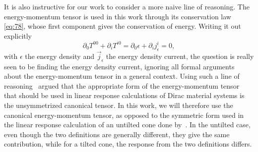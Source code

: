 It is also instructive for our work to consider a more naive line of reasoning.
The energy-momentum tensor is used in this work through its conservation law \cref{eq:78}, whose first component gives the conservation of energy.
Writing it out explicitly
\begin{equation}
  \label{eq:84}
  \partial_0T^{00} + \partial_i T^{i0} = \partial_0 \epsilon + \partial_i j^i_{\epsilon} = 0,
\end{equation}
with \( \epsilon \) the energy density and \( \vec{j}_{\epsilon} \) the energy density current, the question is really seen to be finding the energy density current, ignoring all formal arguments about the energy-momentum tensor in a general context.
Using such a line of reasoning~\textcite{vanderwurffMagnetovorticalThermoelectricTransport2019} argued that the appropriate form of the energy-momentum tensor that should be used in linear response calculations of Dirac material systems is the unsymmetrized canonical tensor.
In this work, we will therefore use the canonical energy-momentum tensor, as opposed to the symmetric form used in the linear response calculation of an untilted cone done by~\textcite{arjonaFingerprintsConformalAnomaly2019}.
In the untilted case, even though the two definitions are generally different, they give the same contribution, while for a tilted cone, the response from the two definitions differs.

